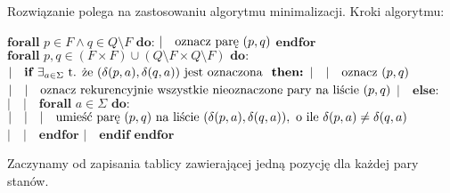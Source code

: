 \documentclass{article}
\begin{document}
    Rozwiązanie polega na zastosowaniu algorytmu minimalizacji. Kroki algorytmu:

    \begin{flushleft}
        $\textbf{forall } p \in F \wedge q \in Q \setminus F \textbf{ do:}$\break
        $|\quad \textnormal{oznacz parę } (p, q)$\break
        $\textbf{endfor}$\break
        $\textbf{forall } p, q \in (F \times F) \cup (Q \setminus F \times Q \setminus F) \textbf{ do:}$\break
        $|\quad \textbf{if } \exists_{a \in \Sigma} \textnormal{ t. że } (\delta(p, a), \delta(q, a)) \textnormal{ jest oznaczona } \textbf{ then:}$\break
        $|\quad |\quad \textnormal{oznacz }(p, q)$\break
        $|\quad |\quad \textnormal{oznacz rekurencyjnie wszystkie nieoznaczone pary na liście } (p, q)$\break
        $|\quad \textbf{else:}$\break
        $|\quad |\quad \textbf{forall } a \in \Sigma \textbf{ do:}$\break
        $|\quad |\quad |\quad \textnormal{umieść parę } (p, q) \textnormal{ na liście } (\delta(p, a), \delta(q, a)), \textnormal{ o ile } \delta(p, a) \neq \delta(q, a)$\break
        $|\quad |\quad \textbf{endfor}$\break
        $|\quad \textbf{endif}$\break
        $\textbf{endfor}$\break
    \end{flushleft}

    Zaczynamy od zapisania tablicy zawierającej jedną pozycję dla każdej pary stanów.
\end{document}
